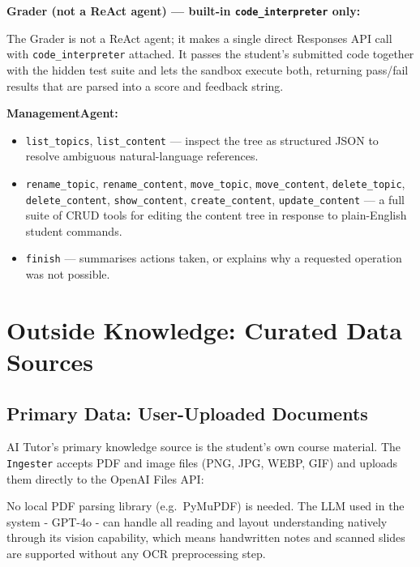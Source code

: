 \documentclass[12pt,a4paper]{article}
\begin{document}
\textbf{Grader (not a ReAct agent) --- built-in \texttt{code\_interpreter} only:}

The Grader is not a ReAct agent; it makes a single direct Responses API call with \texttt{code\_interpreter} attached. It passes the student's submitted code together with the hidden test suite and lets the sandbox execute both, returning pass/fail results that are parsed into a score and feedback string.

\textbf{ManagementAgent:}
\begin{itemize}[leftmargin=*, itemsep=2pt]
  \item \texttt{list\_topics}, \texttt{list\_content} --- inspect the tree as structured JSON to resolve ambiguous natural-language references.
  \item \texttt{rename\_topic}, \texttt{rename\_content}, \texttt{move\_topic}, \texttt{move\_content}, \texttt{delete\_topic}, \texttt{delete\_content}, \texttt{show\_content}, \texttt{create\_content}, \texttt{update\_content} --- a full suite of CRUD tools for editing the content tree in response to plain-English student commands.
  \item \texttt{finish} --- summarises actions taken, or explains why a requested operation was not possible.
\end{itemize}

\section{Outside Knowledge: Curated Data Sources}

\subsection{Primary Data: User-Uploaded Documents}

AI Tutor's primary knowledge source is the student's own course material. The \texttt{Ingester} accepts PDF and image files (PNG, JPG, WEBP, GIF) and uploads them directly to the OpenAI Files API:

No local PDF parsing library (e.g.\ PyMuPDF) is needed. The LLM used in the system - GPT-4o - can handle all reading and layout understanding natively through its vision capability, which means handwritten notes and scanned slides are supported without any
OCR preprocessing step.
\end{document}
